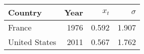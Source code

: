 
\begin{tabular}{lrrr}
\toprule
\textbf{Country} & \textbf{Year} & \textbf{$x_t$} & \textbf{$\sigma$}\\
\midrule
France & 1976 & 0.592 & 1.907\\
United States & 2011 & 0.567 & 1.762\\
\bottomrule
\end{tabular}
